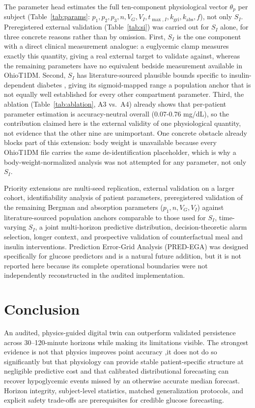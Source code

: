 \documentclass[journal]{IEEEtran}
\begin{document}
The parameter head estimates the full ten-component physiological vector $\theta_p$ per subject (Table~\ref{tab:params}: $p_1, p_2, p_3, n, V_G, V_I, t_{\max,I}, k_{\text{gri}}, k_{\text{abs}}, f$), not only $S_I$. Preregistered external validation (Table~\ref{tab:si}) was carried out for $S_I$ alone, for three concrete reasons rather than by omission. First, $S_I$ is the one component with a direct clinical measurement analogue: a euglycemic clamp measures exactly this quantity, giving a real external target to validate against, whereas the remaining parameters have no equivalent bedside measurement available in OhioT1DM. Second, $S_I$ has literature-sourced plausible bounds specific to insulin-dependent diabetes \cite{ref33}, giving its sigmoid-mapped range a population anchor that is not equally well established for every other compartment parameter. Third, the ablation (Table~\ref{tab:ablation}, A3 vs.\ A4) already shows that per-patient parameter estimation is accuracy-neutral overall (0.07-0.76 mg/dL), so the contribution claimed here is the external validity of one physiological quantity, not evidence that the other nine are unimportant. One concrete obstacle already blocks part of this extension: body weight is unavailable because every OhioT1DM file carries the same de-identification placeholder, which is why a body-weight-normalized analysis was not attempted for any parameter, not only $S_I$.

Priority extensions are multi-seed replication, external validation on a larger cohort, identifiability analysis of patient parameters, preregistered validation of the remaining Bergman and absorption parameters ($p_1, n, V_G, V_I$) against literature-sourced population anchors comparable to those used for $S_I$, time-varying $S_I$, a joint multi-horizon predictive distribution, decision-theoretic alarm selection, longer context, and prospective validation of counterfactual meal and insulin interventions. Prediction Error-Grid Analysis (PRED-EGA) was designed specifically for glucose predictors \cite{ref53} and is a natural future addition, but it is not reported here because its complete operational boundaries were not independently reconstructed in the audited implementation.

\section{Conclusion}

An audited, physics-guided digital twin can outperform validated persistence across 30--120-minute horizons while making its limitations visible. The strongest evidence is not that physics improves point accuracy ,it does not do so significantly but that physiology can provide stable patient-specific structure at negligible predictive cost and that calibrated distributional forecasting can recover hypoglycemic events missed by an otherwise accurate median forecast. Horizon integrity, subject-level statistics, matched generalization protocols, and explicit safety trade-offs are prerequisites for credible glucose forecasting.
\end{document}
